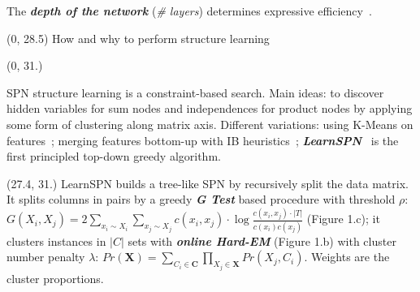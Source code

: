 \documentclass[final]{beamer}
\begin{document}
\begin{frame}{}
\begin{textblock}{25.2}
  The \emph{\textbf{depth of the network}} (\emph{\# layers})
  determines expressive efficiency~\parencite{Martens2014,Zhao2015}.

  \end{textblock}
  
  \begin{textblock}{80}(0, 28.5)
    How and why to perform structure learning
    
  \end{textblock}
  
  \begin{textblock}{25.2}(0, 31.)
    \footnotesize
     
    SPN structure learning is a constraint-based
    search. Main ideas: to discover hidden variables for sum nodes and independences
    for product nodes by applying some form of clustering
    along matrix axis. Different variations:
    using K-Means on
    features~\emph{\parencite{Dennis2012}}; merging features bottom-up
    with IB heuristics\emph{~\parencite{Peharz2013}};
    \emph{\textbf{LearnSPN}}~\emph{\parencite{Gens2013}} is the first principled top-down greedy
    algorithm. 
    

      

      
  \end{textblock}
  
  \begin{textblock}{25.2}(27.4, 31.)
    \footnotesize
    LearnSPN builds a tree-like SPN by recursively split the data
    matrix.  It splits columns in pairs by a greedy \textbf{\emph{G Test}} based
    procedure with threshold $\rho$: $G(X_i, X_j) =  2\sum_{x_i \sim
      X_i}\sum_{x_j \sim X_j}c(x_i, x_j)\cdot \log\frac{c(x_i,
      x_j)\cdot |T|}{c(x_i)c(x_j)}$ (Figure 1.c); it clusters instances in
    $|C|$ sets with \textbf{\emph{online Hard-EM}} (Figure 1.b) with cluster number penalty
    $\lambda$: $Pr(\mathbf{X})= \sum_{C_i \in \mathbf{C}}\prod_{X_j
      \in \mathbf{X}}Pr(X_j,C_i)$. Weights are the cluster proportions.


\end{textblock}
\end{frame}
\end{document}
